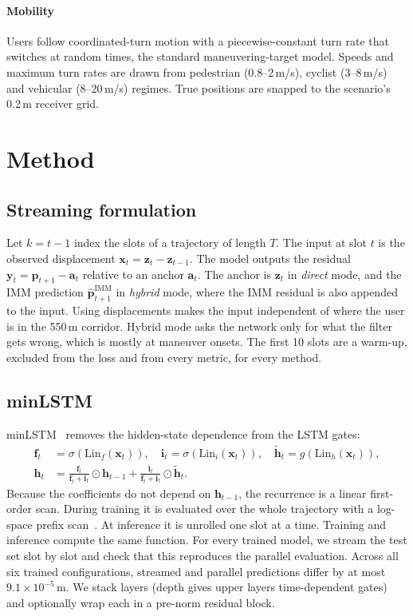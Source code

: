 \documentclass[conference]{IEEEtran}
\begin{document}
\paragraph*{Mobility}
Users follow coordinated-turn motion with a piecewise-constant turn rate that
switches at random times, the standard maneuvering-target model. Speeds and
maximum turn rates are drawn from pedestrian (0.8--2\,m/s), cyclist
(3--8\,m/s) and vehicular (8--20\,m/s) regimes. True positions are snapped to
the scenario's 0.2\,m receiver grid.

\section{Method}

\subsection{Streaming formulation}
Let $k = t-1$ index the slots of a trajectory of length $T$. The input at slot
$t$ is the observed displacement $\mathbf{x}_t = \mathbf{z}_t - \mathbf{z}_{t-1}$.
The model outputs the residual $\mathbf{y}_t = \mathbf{p}_{t+1} - \mathbf{a}_t$
relative to an anchor $\mathbf{a}_t$. The anchor is $\mathbf{z}_t$ in
\emph{direct} mode, and the IMM prediction $\hat{\mathbf{p}}^{\mathrm{IMM}}_{t+1}$
in \emph{hybrid} mode, where the IMM residual is also appended to the input.
Using displacements makes the input independent of where the user is in the
550\,m corridor. Hybrid mode asks the network only for what the filter gets
wrong, which is mostly at maneuver onsets. The first 10 slots are a warm-up,
excluded from the loss and from every metric, for every method.

\subsection{minLSTM}
minLSTM~\cite{feng2024minrnn} removes the hidden-state dependence from the LSTM
gates:
\begin{align}
  \mathbf{f}_t &= \sigma(\mathrm{Lin}_f(\mathbf{x}_t)), \quad
  \mathbf{i}_t = \sigma(\mathrm{Lin}_i(\mathbf{x}_t)), \quad
  \tilde{\mathbf{h}}_t = g(\mathrm{Lin}_h(\mathbf{x}_t)), \nonumber\\
  \mathbf{h}_t &= \frac{\mathbf{f}_t}{\mathbf{f}_t + \mathbf{i}_t} \odot \mathbf{h}_{t-1}
  + \frac{\mathbf{i}_t}{\mathbf{f}_t + \mathbf{i}_t} \odot \tilde{\mathbf{h}}_t .
\end{align}
Because the coefficients do not depend on $\mathbf{h}_{t-1}$, the recurrence is
a linear first-order scan. During training it is evaluated over the whole
trajectory with a log-space prefix scan~\cite{heinsen2023scan}. At inference
it is unrolled one slot at a time. Training and inference compute the same
function. For every trained model, we stream the test set slot by slot and
check that this reproduces the parallel evaluation. Across all six trained
configurations, streamed and parallel predictions differ by at most
$9.1\times10^{-5}$\,m.
We stack layers (depth gives upper layers time-dependent gates) and
optionally wrap each in a pre-norm residual block.
\end{document}

